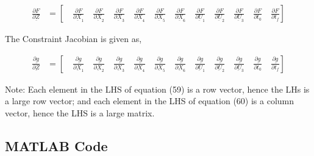 \documentclass[11pt,usenames]{article}
\begin{document}
	\begin{align}
	\frac{\partial F}{\partial \underbar Z} &= \left[ \quad \frac{\partial F}{\partial \underbar X_{1}} \quad \frac{\partial F}{\partial \underbar X_{2}} \quad \frac{\partial F}{\partial \underbar X_{3}} \quad \frac{\partial F}{\partial \underbar X_{4}} \quad \frac{\partial F}{\partial \underbar X_{5}} \quad \frac{\partial F}{\partial \underbar X_{6}} \quad \frac{\partial F}{\partial \underbar U_{1}} \quad \frac{\partial F}{\partial \underbar U_{2}} \quad \frac{\partial F}{\partial \underbar U_{3}} \quad \frac{\partial F}{\partial t_{0}} \quad \frac{\partial F}{\partial t_{f}} \right]
	\end{align}
	
	The Constraint Jacobian is given as,
	
	\begin{align}
	\frac{\partial \underbar g}{\partial \underbar Z}  &= \left[ \quad \frac{\partial \underbar g}{\partial \underbar X_{1}} \quad \frac{\partial \underbar g}{\partial \underbar X_{2}} \quad \frac{\partial \underbar g}{\partial \underbar X_{3}} \quad \frac{\partial \underbar g}{\partial \underbar X_{4}} \quad \frac{\partial \underbar g}{\partial \underbar X_{5}}\quad \frac{\partial \underbar g}{\partial \underbar X_{6}} \quad \frac{\partial \underbar g}{\partial \underbar U_{1}} \quad \frac{\partial \underbar g}{\partial \underbar U_{2}} \quad \frac{\partial \underbar g}{\partial \underbar U_{3}} \quad \frac{\partial \underbar g}{\partial t_{0}} \quad \frac{\partial \underbar g}{\partial t_{f}} \right]
	\end{align}
	
	Note: Each element in the LHS of equation (59) is a row vector, hence the LHs is a large row vector; and each element in the LHS of equation (60) is a column vector, hence the LHS is a large matrix.
	
	\newpage
	
	
	\subsection{MATLAB Code}
	
	
	
	\newpage
	
	
	
	\newpage
	
	
	
	\newpage
	
	
	
\end{document}
